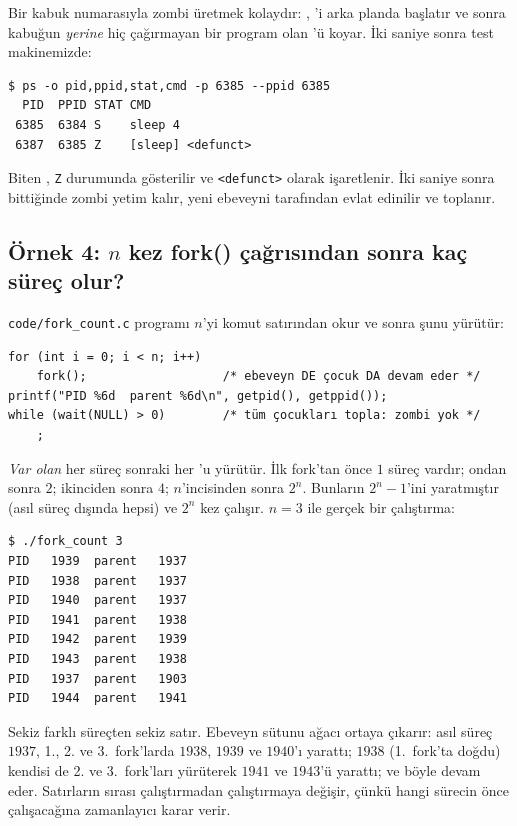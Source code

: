 Bir kabuk numarasıyla zombi üretmek kolaydır: , 'i arka planda başlatır ve sonra kabuğun \emph{yerine} hiç  çağırmayan bir program olan 'ü koyar. İki saniye sonra test makinemizde:

\begin{lstlisting}[style=term]
$ ps -o pid,ppid,stat,cmd -p 6385 --ppid 6385
  PID  PPID STAT CMD
 6385  6384 S    sleep 4
 6387  6385 Z    [sleep] <defunct>
\end{lstlisting}

Biten , \texttt{Z} durumunda gösterilir ve \texttt{<defunct>} olarak işaretlenir. İki saniye sonra  bittiğinde zombi yetim kalır, yeni ebeveyni tarafından evlat edinilir ve toplanır.

\subsection{Örnek 4: $n$ kez fork() çağrısından sonra kaç süreç olur?}

\texttt{code/fork\_count.c} programı $n$'yi komut satırından okur ve sonra şunu yürütür:
\begin{lstlisting}
for (int i = 0; i < n; i++)
    fork();                   /* ebeveyn DE çocuk DA devam eder */
printf("PID %6d  parent %6d\n", getpid(), getppid());
while (wait(NULL) > 0)        /* tüm çocukları topla: zombi yok */
    ;
\end{lstlisting}

\emph{Var olan} her süreç sonraki her 'u yürütür. İlk fork'tan önce $1$ süreç vardır; ondan sonra $2$; ikinciden sonra $4$; $n$'incisinden sonra $2^{n}$. Bunların $2^{n} - 1$'ini  yaratmıştır (asıl süreç dışında hepsi) ve  $2^{n}$ kez çalışır. $n = 3$ ile gerçek bir çalıştırma:

\begin{lstlisting}[style=term]
$ ./fork_count 3
PID   1939  parent   1937
PID   1938  parent   1937
PID   1940  parent   1937
PID   1941  parent   1938
PID   1942  parent   1939
PID   1943  parent   1938
PID   1937  parent   1903
PID   1944  parent   1941
\end{lstlisting}

Sekiz farklı süreçten sekiz satır. Ebeveyn sütunu ağacı ortaya çıkarır: asıl süreç $1937$, 1., 2. ve 3.~fork'larda $1938$, $1939$ ve $1940$'ı yarattı; $1938$ (1.~fork'ta doğdu) kendisi de 2. ve 3.~fork'ları yürüterek $1941$ ve $1943$'ü yarattı; ve böyle devam eder. Satırların sırası çalıştırmadan çalıştırmaya değişir, çünkü hangi sürecin önce çalışacağına zamanlayıcı karar verir.

